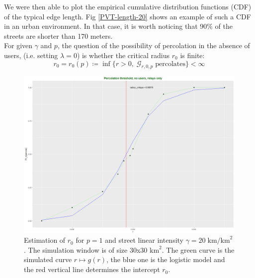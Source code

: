 \documentclass[conference]{IEEEtran}
\begin{document}
We were then able to plot the empirical cumulative distribution functions (CDF) of the typical edge length. Fig \ref{PVT-length-20} shows an example of such a CDF in an urban environment. In that case, it is worth noticing that 90\% of the streets are shorter than 170 meters. \\
\indent For given $\gamma$ and $p$, the question of the possibility of percolation in the absence of users, (i.e. setting $\lambda =0$) is whether the critical radius $r_{0}$ is finite:
\begin{equation}
\label{critical-radius}
r_{0} = r_{0}(p) \coloneqq \inf \lbrace r > 0, \; \mathcal{G}_{r,0,p} \; \text{percolates} \rbrace < \infty
\end{equation}
\begin{figure}[t!]
\centering
\includegraphics[width=\columnwidth]{Figures/sites-rgamma0-p_1.png}
\caption{Estimation of $r_{0}$ for $p=1$ and street linear intensity $\gamma = 20 \; \text{km/km}^{2}$. The simulation window is of size 30x30 $\text{km}^{2}$. The green curve is the simulated curve $r \mapsto g(r)$, the blue one is the logistic model and the red vertical line determines the intercept $r_{0}$.}
\label{good-logistic-rgamma0}
\end{figure}
\end{document}
